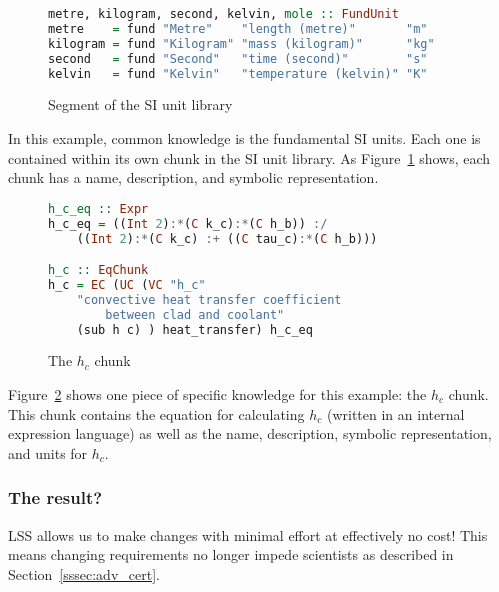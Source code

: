 \documentclass{sig-alternate-05-2015}
\newcommand{\lss}{LSS}
\begin{document}
\begin{figure}
\begin{lstlisting}[language=Haskell, frame=single, showstringspaces=false, basicstyle=\tiny]
metre, kilogram, second, kelvin, mole :: FundUnit
metre    = fund "Metre"    "length (metre)"       "m"
kilogram = fund "Kilogram" "mass (kilogram)"      "kg"
second   = fund "Second"   "time (second)"        "s"
kelvin   = fund "Kelvin"   "temperature (kelvin)" "K"
\end{lstlisting}
\caption{Segment of the SI unit library}
\label{fig:know_common}
\end{figure}

In this example, common knowledge is the fundamental SI units. Each one is
contained within its own chunk in the SI unit library. As
Figure~\ref{fig:know_common} shows, each chunk has a name, description, and
symbolic representation.

\begin{figure}
\begin{lstlisting}[language=Haskell, frame=single, showstringspaces=false, basicstyle=\small]
h_c_eq :: Expr
h_c_eq = ((Int 2):*(C k_c):*(C h_b)) :/ 
    ((Int 2):*(C k_c) :+ ((C tau_c):*(C h_b)))

h_c :: EqChunk
h_c = EC (UC (VC "h_c" 
    "convective heat transfer coefficient 
        between clad and coolant"
    (sub h c) ) heat_transfer) h_c_eq
\end{lstlisting}
\caption{The $h_c$ chunk}
\label{fig:know_specific}
\end{figure}

Figure~\ref{fig:know_specific} shows one piece of specific knowledge for this
example: the $h_c$ chunk. This chunk contains the equation for calculating $h_c$
(written in an internal expression language)
as well as the name, description, symbolic representation, and units for $h_c$.
\subsubsection{The result?} \label{sssec:ex_result}

\lss{} allows us to make changes with minimal effort at effectively no cost!
This means changing requirements no longer impede scientists as described in
Section~\ref{sssec:adv_cert}.
\end{document}
